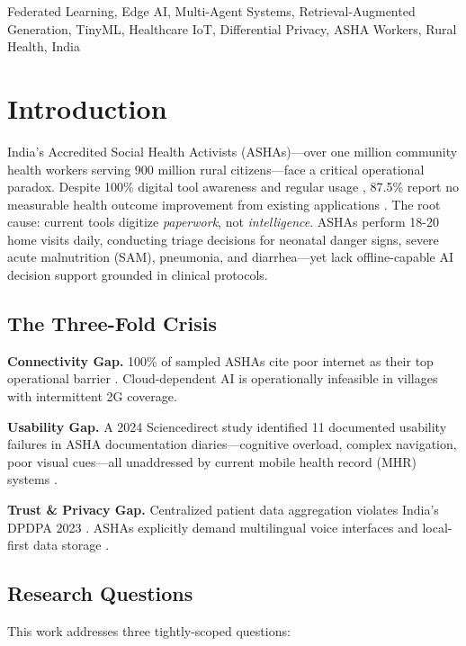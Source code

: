 \documentclass[conference,compsoc]{IEEEtran}
\begin{document}
\begin{IEEEkeywords}
Federated Learning, Edge AI, Multi-Agent Systems, Retrieval-Augmented Generation, TinyML, Healthcare IoT, Differential Privacy, ASHA Workers, Rural Health, India
\end{IEEEkeywords}

\section{Introduction}

India's Accredited Social Health Activists (ASHAs)—over one million community health workers serving 900 million rural citizens—face a critical operational paradox. Despite 100\% digital tool awareness and regular usage \cite{meghalaya_asha_2025}, 87.5\% report no measurable health outcome improvement from existing applications \cite{meghalaya_asha_2025}. The root cause: current tools digitize \textit{paperwork}, not \textit{intelligence}. ASHAs perform 18-20 home visits daily, conducting triage decisions for neonatal danger signs, severe acute malnutrition (SAM), pneumonia, and diarrhea—yet lack offline-capable AI decision support grounded in clinical protocols.

\subsection{The Three-Fold Crisis}

\textbf{Connectivity Gap.} 100\% of sampled ASHAs cite poor internet as their top operational barrier \cite{meghalaya_asha_2025}. Cloud-dependent AI is operationally infeasible in villages with intermittent 2G coverage.

\textbf{Usability Gap.} A 2024 Sciencedirect study identified 11 documented usability failures in ASHA documentation diaries—cognitive overload, complex navigation, poor visual cues—all unaddressed by current mobile health record (MHR) systems \cite{asha_digital_usability}.

\textbf{Trust \& Privacy Gap.} Centralized patient data aggregation violates India's DPDPA 2023 \cite{dpdpa_2023}. ASHAs explicitly demand multilingual voice interfaces and local-first data storage \cite{asha_codesign_ndhm}.

\subsection{Research Questions}

This work addresses three tightly-scoped questions:
\end{document}
